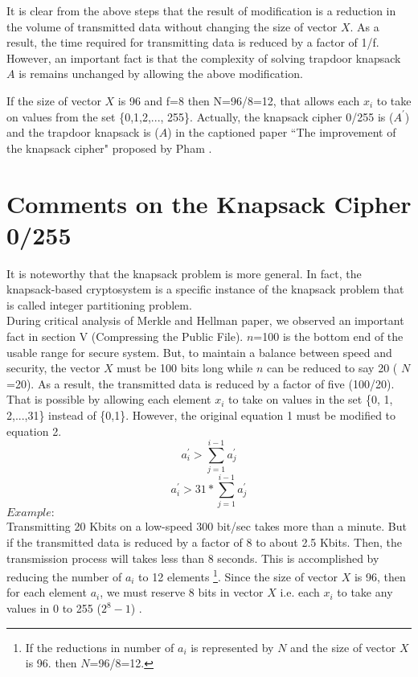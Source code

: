 \documentclass[5p,times,twocolumn]{elsarticle}
\begin{document}
It is clear from the above steps that the result of modification is a reduction in the volume of transmitted data without changing the size of vector $X$. As a result, the time required for transmitting data is reduced by a factor of 1/f. However, an important fact is that the complexity of solving trapdoor knapsack $A$ is remains unchanged by allowing the above modification.

If the size of vector $X$ is 96 and f=8 then N=96/8=12, that allows each $x_{i}$ to take on values from the set \{0,1,2,..., 255\}. Actually, the knapsack cipher 0/255 is ($A^{'}$) and the trapdoor knapsack is ($A$) in the captioned paper ``The improvement of the knapsack cipher"  proposed by Pham \cite{pham2011improvement}. 


\section{Comments on the Knapsack Cipher 0/255}
\label{sec:3}
It is noteworthy that the knapsack problem is more general. In fact, the knapsack-based cryptosystem is a specific instance of the knapsack problem that is called integer partitioning problem. \\
\indent During critical analysis of Merkle and Hellman paper\cite{merkle1978hiding}, we observed an important fact in section V (Compressing the Public File).
$n$=100 is the bottom end of the usable range for secure system. But, to maintain a balance between speed and security, the vector $X$ must be 100 bits long while $n$ can be reduced to say 20 ( $N$=20). As a result, the transmitted data is reduced by a factor of five (100/20). That is possible by allowing each element $x_{i}$ to take on values in the set \{0, 1, 2,...,31\} instead of \{0,1\}. However, the original equation 1 must be modified to equation 2.
\begin{equation}
a^{'}_{i} > \sum_{j=1}^{i-1} a^{'}_j
\end{equation}
\begin{equation}
a^{'}_{i} > 31*\sum_{j=1}^{i-1} a^{'}_j
\end{equation}
$Example:$\\ 
Transmitting 20 Kbits on a low-speed 300 bit/sec takes more than a minute. But if the transmitted data is reduced by a factor of 8 to about 2.5 Kbits. Then, the transmission process will  takes less than 8 seconds. This is accomplished by reducing the number of $a_i$ to 12 elements \footnote{If the reductions in number of $a_i$ is represented by $N$ and the size of vector $X$ is 96. then $N$=96/8=12.}. Since the size of vector $X$ is 96, then for each element $a_i$, we must reserve 8 bits in vector $X$ i.e. each $x_i$ to take any values in 0 to 255 ($2^{8}-1$) .
\end{document}
